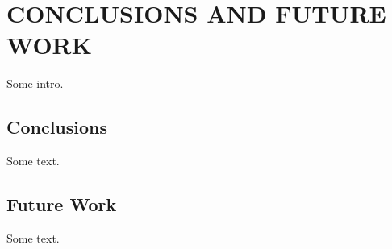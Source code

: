 \chapter{CONCLUSIONS AND FUTURE WORK\label{chapter:conc_and_future}}

Some intro.

\section{Conclusions\label{sec:conclusions}}

Some text.

\section{Future Work\label{sec:future_work}}

Some text.
